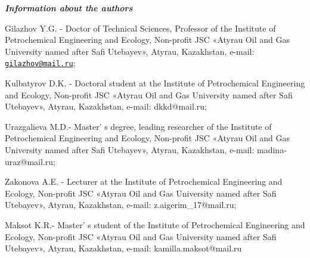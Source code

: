 \emph{{\bfseries Information about the authors}}

Gilazhov Y.G. - Doctor of Technical Sciences, Professor of the Institute
of Petrochemical Engineering and Ecology, Non-profit JSC «Atyrau Oil and
Gas University named after Safi Utebayev», Atyrau, Kazakhstan, e-mail:
\href{mailto:gilazhov@mail.ru}{\nolinkurl{gilazhov@mail.ru}};

Kulbatyrov D.K. - Doctoral student at the Institute of Petrochemical
Engineering and Ecology, Non-profit JSC «Atyrau Oil and Gas University
named after Safi Utebayev», Atyrau, Kazakhstan, e-mail: dkkd@mail.ru;

Urazgalieva M.D.- Master' s degree, leading researcher of
the Institute of Petrochemical Engineering and Ecology, Non-profit JSC
«Atyrau Oil and Gas University named after Safi Utebayev», Atyrau,
Kazakhstan, e-mail: madina-uraz@mail.ru;

Zakonova A.E. - Lecturer at the Institute of Petrochemical Engineering
and Ecology, Non-profit JSC «Atyrau Oil and Gas University named after
Safi Utebayev», Atyrau, Kazakhstan, e-mail: z.aigerim\_17@mail.ru;

Maksot K.R.- Master' s student of the Institute of
Petrochemical Engineering and Ecology, Non-profit JSC «Atyrau Oil and
Gas University named after Safi Utebayev», Atyrau, Kazakhstan, e-mail:
kamilla.maksot@mail.ru
